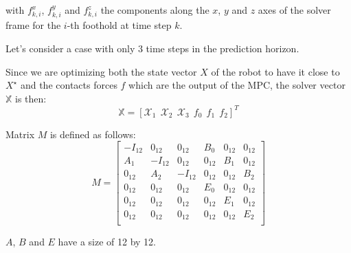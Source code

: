 \documentclass[a4paper,11pt]{article}
\begin{document}
with $f^x_{k,i}$, $f^y_{k,i}$ and $f^z_{k,i}$ the components along the $x$, $y$ and $z$ axes of the solver frame for the $i$-th foothold at time step $k$.

Let's consider a case with only 3 time steps in the prediction horizon.

Since we are optimizing both the state vector $X$ of the robot to have it close to $X^\star$ and the contacts forces $f$ which are the output of the MPC, the solver vector $\mathbb{X}$ is then:
\begin{equation}
\mathbb{X} = [\mathcal{X}_1 ~~ \mathcal{X}_2 ~~ \mathcal{X}_3 ~~ f_0 ~~ f_1 ~~ f_2 ]^T
\end{equation}

Matrix $M$ is defined as follows:
\begin{equation}
M = \begin{bmatrix} 
-I_{12} & 0_{12} & 0_{12}  & B_0 & 0_{12} & 0_{12}  \\
A_1 & -I_{12} & 0_{12}  & 0_{12} & B_1 & 0_{12} \\
0_{12} & A_2 & -I_{12}  & 0_{12} & 0_{12} & B_2 \\
0_{12} & 0_{12} & 0_{12}  & E_0 & 0_{12} & 0_{12} \\
0_{12} & 0_{12} & 0_{12}  & 0_{12} & E_1 & 0_{12} \\
0_{12} & 0_{12} & 0_{12}  & 0_{12} & 0_{12} & E_2 \\ \end{bmatrix}
\end{equation}

$A$, $B$ and $E$ have a size of 12 by 12.
\end{document}
